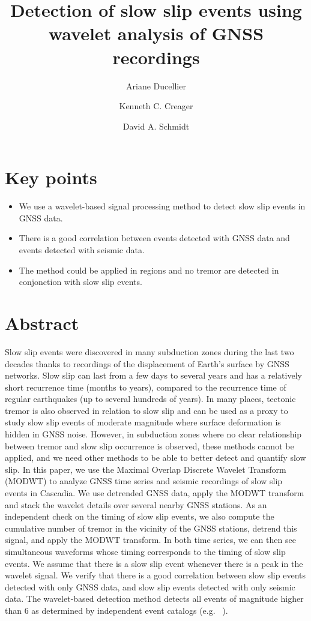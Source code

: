 \documentclass{article}
\title{Detection of slow slip events using wavelet analysis of GNSS recordings}
\author[1]{Ariane Ducellier}
\author[1]{Kenneth C. Creager}
\author[1]{David A. Schmidt}
\affil[1]{University of Washington, Department of Earth and Space Sciences, Box 351310, 4000 15th Avenue NE Seattle, WA 98195-1310}
\date{}
\begin{document}
\maketitle

\section*{Key points}

\begin{itemize}
\item We use a wavelet-based signal processing method to detect slow slip events in GNSS data.
\item There is a good correlation between events detected with GNSS data and events detected with seismic data.
\item The method could be applied in regions and no tremor are detected in conjonction with slow slip events.
\end{itemize}

\newpage

\section*{Abstract}

Slow slip events were discovered in many subduction zones during the last two decades thanks to recordings of the displacement of Earth's surface by GNSS networks. Slow slip can last from a few days to several years and has a relatively short recurrence time (months to years), compared to the recurrence time of regular earthquakes (up to several hundreds of years). In many places, tectonic tremor is also observed in relation to slow slip and can be used as a proxy to study slow slip events of moderate magnitude where surface deformation is hidden in GNSS noise. However, in subduction zones where no clear relationship between tremor and slow slip occurrence is observed, these methods cannot be applied, and we need other methods to be able to better detect and quantify slow slip. In this paper, we use the Maximal Overlap Discrete Wavelet Transform (MODWT) to analyze GNSS time series and seismic recordings of slow slip events in Cascadia. We use detrended GNSS data, apply the MODWT transform and stack the wavelet details over several nearby GNSS stations. As an independent check on the timing of slow slip events, we also compute the cumulative number of tremor in the vicinity of the GNSS stations, detrend this signal, and apply the MODWT transform. In both time series, we can then see simultaneous waveforms whose timing corresponds to the timing of slow slip events. We assume that there is a slow slip event whenever there is a peak in the wavelet signal. We verify that there is a good correlation between slow slip events detected with only GNSS data, and slow slip events detected with only seismic data. The wavelet-based detection method detects all events of magnitude higher than 6 as determined by independent event catalogs (e.g. ~\citet{MIC_2019}).
\end{document}
